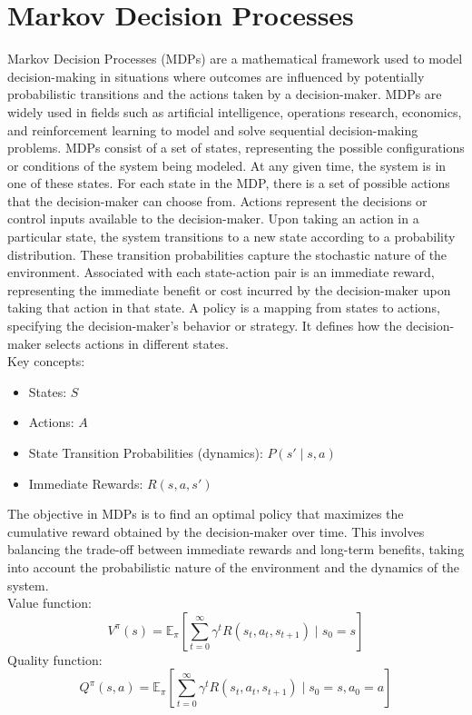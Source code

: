 \documentclass[letterpaper, 10 pt, conference]{ieeeconf}  %
\begin{document}
	\IEEEpeerreviewmaketitle
	
	\section{Markov Decision Processes}
	Markov Decision Processes (MDPs) are a mathematical framework used to model decision-making in situations where outcomes are influenced by potentially probabilistic transitions and the actions taken by a decision-maker. MDPs are widely used in fields such as artificial intelligence, operations research, economics, and reinforcement learning to model and solve sequential decision-making problems. MDPs consist of a set of states, representing the possible configurations or conditions of the system being modeled. At any given time, the system is in one of these states. For each state in the MDP, there is a set of possible actions that the decision-maker can choose from. Actions represent the decisions or control inputs available to the decision-maker. Upon taking an action in a particular state, the system transitions to a new state according to a probability distribution. These transition probabilities capture the stochastic nature of the environment. Associated with each state-action pair is an immediate reward, representing the immediate benefit or cost incurred by the decision-maker upon taking that action in that state. A policy is a mapping from states to actions, specifying the decision-maker's behavior or strategy. It defines how the decision-maker selects actions in different states. \\
	Key concepts:
	\begin{itemize}
		\item States: $S$
		\item Actions: $A$
		\item State Transition Probabilities (dynamics): $P(s' \mid s, a)$
		\item Immediate Rewards: $R(s, a, s')$
	\end{itemize}
	The objective in MDPs is to find an optimal policy that maximizes the cumulative reward obtained by the decision-maker over time. This involves balancing the trade-off between immediate rewards and long-term benefits, taking into account the probabilistic nature of the environment and the dynamics of the system.\\
	Value function:
	\begin{equation}
		V^{\pi}(s) = \mathbb{E}_{\pi} \left[ \sum_{t=0}^{\infty} \gamma^t R(s_t, a_t, s_{t+1}) \mid s_0 = s \right]
	\end{equation}
	Quality function:
	\begin{equation}
		Q^{\pi}(s,a) = \mathbb{E}_{\pi} \left[ \sum_{t=0}^{\infty} \gamma^t R(s_t, a_t, s_{t+1}) \mid s_0 = s, a_0 = a \right]
	\end{equation}
\end{document}
